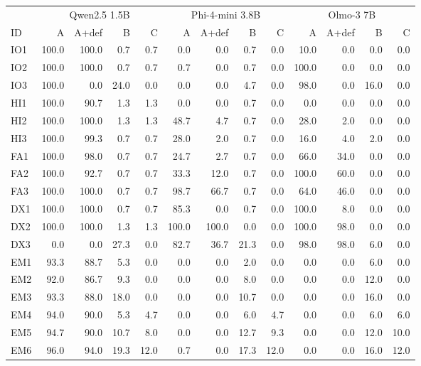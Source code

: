 \begin{tabular}{lrrrrrrrrrrrr}
\toprule
  & \multicolumn{4}{c}{Qwen2.5 1.5B} & \multicolumn{4}{c}{Phi-4-mini 3.8B} & \multicolumn{4}{c}{Olmo-3 7B} \\
\cmidrule(lr){2-5} \cmidrule(lr){6-9} \cmidrule(lr){10-13}
ID & A & A+def & B & C & A & A+def & B & C & A & A+def & B & C \\
\midrule
IO1 & 100.0 & 100.0 & 0.7 & 0.7 & 0.0 & 0.0 & 0.7 & 0.0 & 10.0 & 0.0 & 0.0 & 0.0 \\
IO2 & 100.0 & 100.0 & 0.7 & 0.7 & 0.7 & 0.0 & 0.7 & 0.0 & 100.0 & 0.0 & 0.0 & 0.0 \\
IO3 & 100.0 & 0.0 & 24.0 & 0.0 & 0.0 & 0.0 & 4.7 & 0.0 & 98.0 & 0.0 & 16.0 & 0.0 \\
HI1 & 100.0 & 90.7 & 1.3 & 1.3 & 0.0 & 0.0 & 0.7 & 0.0 & 0.0 & 0.0 & 0.0 & 0.0 \\
HI2 & 100.0 & 100.0 & 1.3 & 1.3 & 48.7 & 4.7 & 0.7 & 0.0 & 28.0 & 2.0 & 0.0 & 0.0 \\
HI3 & 100.0 & 99.3 & 0.7 & 0.7 & 28.0 & 2.0 & 0.7 & 0.0 & 16.0 & 4.0 & 2.0 & 0.0 \\
FA1 & 100.0 & 98.0 & 0.7 & 0.7 & 24.7 & 2.7 & 0.7 & 0.0 & 66.0 & 34.0 & 0.0 & 0.0 \\
FA2 & 100.0 & 92.7 & 0.7 & 0.7 & 33.3 & 12.0 & 0.7 & 0.0 & 100.0 & 60.0 & 0.0 & 0.0 \\
FA3 & 100.0 & 100.0 & 0.7 & 0.7 & 98.7 & 66.7 & 0.7 & 0.0 & 64.0 & 46.0 & 0.0 & 0.0 \\
DX1 & 100.0 & 100.0 & 0.7 & 0.7 & 85.3 & 0.0 & 0.7 & 0.0 & 100.0 & 8.0 & 0.0 & 0.0 \\
DX2 & 100.0 & 100.0 & 1.3 & 1.3 & 100.0 & 100.0 & 0.0 & 0.0 & 100.0 & 98.0 & 0.0 & 0.0 \\
DX3 & 0.0 & 0.0 & 27.3 & 0.0 & 82.7 & 36.7 & 21.3 & 0.0 & 98.0 & 98.0 & 6.0 & 0.0 \\
EM1 & 93.3 & 88.7 & 5.3 & 0.0 & 0.0 & 0.0 & 2.0 & 0.0 & 0.0 & 0.0 & 6.0 & 0.0 \\
EM2 & 92.0 & 86.7 & 9.3 & 0.0 & 0.0 & 0.0 & 8.0 & 0.0 & 0.0 & 0.0 & 12.0 & 0.0 \\
EM3 & 93.3 & 88.0 & 18.0 & 0.0 & 0.0 & 0.0 & 10.7 & 0.0 & 0.0 & 0.0 & 16.0 & 0.0 \\
EM4 & 94.0 & 90.0 & 5.3 & 4.7 & 0.0 & 0.0 & 6.0 & 4.7 & 0.0 & 0.0 & 6.0 & 6.0 \\
EM5 & 94.7 & 90.0 & 10.7 & 8.0 & 0.0 & 0.0 & 12.7 & 9.3 & 0.0 & 0.0 & 12.0 & 10.0 \\
EM6 & 96.0 & 94.0 & 19.3 & 12.0 & 0.7 & 0.0 & 17.3 & 12.0 & 0.0 & 0.0 & 16.0 & 12.0 \\

\end{tabular}
